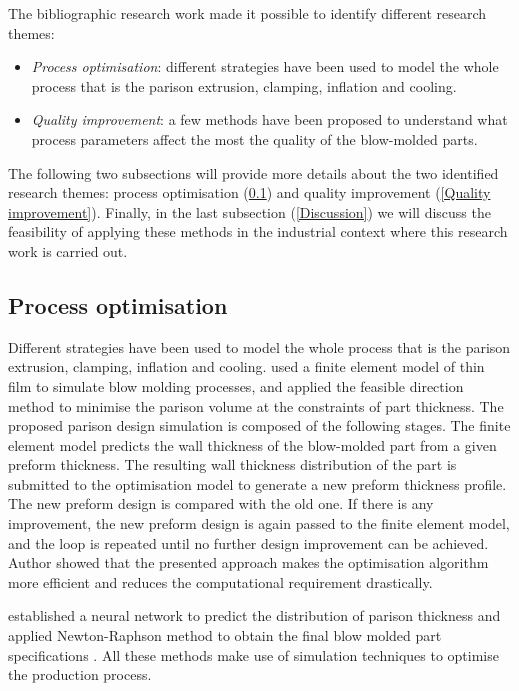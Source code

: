 The bibliographic research work made it possible to identify different research themes:

\begin{itemize}
    \item \textit{Process optimisation}: different strategies have been used to model the whole process that is the parison extrusion, clamping, inflation and cooling. 
    \item \textit{Quality improvement}: a few methods have been proposed to understand what process parameters affect the most the quality of the blow-molded parts.
\end{itemize}

The following two subsections will provide more details about the two identified research themes: process optimisation (\ref{Process optimisation}) and quality improvement (\ref{Quality improvement}). Finally, in the last subsection (\ref{Discussion}) we will discuss the feasibility of applying these methods in the industrial context where this research work is carried out. 

\subsection{Process optimisation} \label{Process optimisation}

Different strategies have been used to model the whole process that is the parison extrusion, clamping, inflation and cooling. \citep{lee1996prediction} used a finite element model of thin film to simulate blow molding processes, and applied the feasible direction method to minimise the parison volume at the constraints of part thickness. The proposed parison design simulation is composed of the following stages. The finite element model predicts the wall thickness of the blow-molded part from a given preform thickness. The resulting wall thickness distribution of the part is submitted to the optimisation model to generate a new preform thickness profile. The new preform design is compared with the old one. If there is any improvement, the new preform design is again passed to the finite element model, and the loop is repeated until no further design improvement can be achieved. Author showed that the presented approach makes the optimisation algorithm more efficient and reduces the computational requirement drastically.

\citep{diraddo1993line} established a neural network to predict the distribution of parison thickness and applied Newton-Raphson method to obtain the final blow molded part specifications \citep{diraddo1993profile}. All these methods make use of simulation techniques to optimise the production process.  

